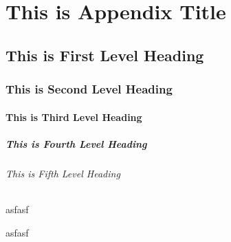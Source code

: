 \appendix
\chapter{This is Appendix Title}

\section{This is First Level Heading}
\lipsum[1-2]

\subsection{This is Second Level Heading}
\lipsum[3]

\subsubsection{This is Third Level Heading}
\lipsum[4]

\paragraph{This is Fourth Level Heading}
\lipsum[5]

\subparagraph{This is Fifth Level Heading}
\lipsum[6]
\begin{theorem}
asfasf
\end{theorem}
\begin{theorem}
asfasf
\end{theorem}


